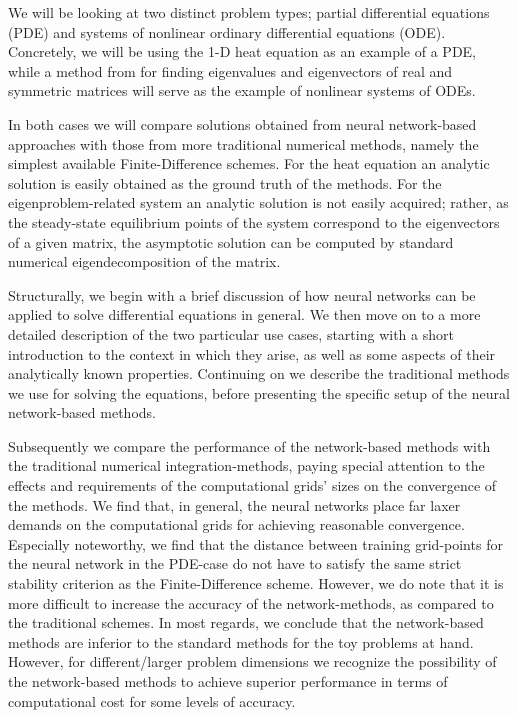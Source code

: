 \documentclass[reprint, english, nofootinbib]{revtex4-2}
\begin{document}
We will be looking at two distinct problem types; partial differential equations (PDE) and systems of nonlinear ordinary differential equations (ODE). Concretely, we will be using the 1-D heat equation as an example of a PDE, while a method from \cite{Yi_2004} for finding eigenvalues and eigenvectors of real and symmetric matrices will serve as the example of nonlinear systems of ODEs.

In both cases we will compare solutions obtained from neural network-based approaches with those from more traditional numerical methods, namely the simplest available Finite-Difference schemes. For the heat equation an analytic solution is easily obtained as the ground truth of the methods. For the eigenproblem-related system an analytic solution is not easily acquired; rather, as the steady-state equilibrium points of the system correspond to the eigenvectors of a given matrix, the asymptotic solution can be computed by standard numerical eigendecomposition of the matrix.

Structurally, we begin with a brief discussion of how neural networks can be applied to solve differential equations in general. We then move on to a more detailed description of the two particular use cases, starting with a short introduction to the context in which they arise, as well as some aspects of their analytically known properties. Continuing on we describe the traditional methods we use for solving the equations, before presenting the specific setup of the neural network-based methods.

Subsequently we compare the performance of the network-based methods with the traditional numerical integration-methods, paying special attention to the effects and requirements of the computational grids' sizes on the convergence of the methods. We find that, in general, the neural networks place far laxer demands on the computational grids for achieving reasonable convergence. Especially noteworthy, we find that the distance between training grid-points for the neural network in the PDE-case do not have to satisfy the same strict stability criterion as the Finite-Difference scheme. However, we do note that it is more difficult to increase the accuracy of the network-methods, as compared to the traditional schemes. In most regards, we conclude that the network-based methods are inferior to the standard methods for the toy problems at hand. However, for different/larger problem dimensions we recognize the possibility of the network-based methods to achieve superior performance in terms of computational cost for some levels of accuracy.
\end{document}
